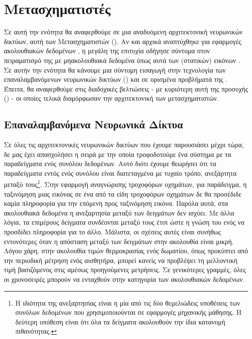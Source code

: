 \section{Μετασχηματιστές}

Σε αυτή την ενότητα θα αναφερθούμε σε μια αναδυόμενη αρχιτεκτονική νευρωνικών δικτύων, αυτή των Μετασχηματιστών (). Αν και αρχικά αναπτύχθηκε για εφαρμογές ακολουθιακών δεδομένων \cite{transformers_attention_is_all_you_need}, η μεγάλη της επιτυχία οδήγησε σύντομα στον πειραματισμό της με μη\textendash ακολουθιακά δεδομένα όπως αυτά των (στατικών) εικόνων \cite{dosovitskiy2020image_is_worth_16, carion2020_end_to_end_transformers}. Σε αυτήν την ενότητα θα κάνουμε μια σύντομη εισαγωγή στην τεχνολογία των επαναλαμβανόμενων νευρωνικών δικτύων ()\cite{rumelhart1985learning_internal_representations} και σε ορισμένα προβλήματά της \cite{hochreiter1997lstm,bahdanau2014neural_machine_translation_attention_begins, transformers_attention_is_all_you_need}. Έπειτα, θα αναφερθούμε στις διαδοχικές βελτιώσεις - με κυριότερη αυτή της προσοχής ()\cite{bahdanau2014neural_machine_translation_attention_begins} - οι οποίες τελικά διαμόρφωσαν την αρχιτεκτονική των μετασχηματιστών.

\subsection{Επαναλαμβανόμενα Νευρωνικά Δίκτυα}
Σε όλες τις αρχιτεκτονικές νευρωνικών δικτύων που έχουμε παρουσιάσει μέχρι τώρα, δε μας έχει απασχολήσει η σειρά με την οποία τροφοδοτούμε ένα σύστημα με τα παραδείγματα ενός συνόλου δεδομένων. Αυτό διότι έχουμε θεωρήσει ότι τα παραδείγματα εντός ενός συνόλου είναι διατεταγμένα με τυχαίο τρόπο, ανεξάρτητα μεταξύ τους\footnote{Η ιδιότητα της ανεξαρτησίας είναι η μία από τις δύο θεμελιώδεις υποθέσεις των συνόλων δεδομένων που χρησιμοποιούνται σε εφαρμογές μηχανικής μάθησης. Η δεύτερη υπόθεση είναι ότι όλα τα δείγματα ακολουθούν την ίδια κατανομή πιθανότητας.}. Στην εφαρμογή αναγνώρισης τροχοφόρων οχημάτων, για παράδειγμα, η ταξινόμηση μιας εικόνας σε ένα από τα είδη τροχοφόρων οχημάτων δε θα προσέδιδε καμία πληροφορία για την επόμενη προς ταξινόμηση εικόνα. Παρόλα αυτά, στα ακολουθιακά δεδομένα η ανεξαρτησία μεταξύ των δειγμάτων δεν ισχύει. Με άλλα λόγια, τα επιμέρους δείγματα συνδέονται μεταξύ τους έτσι ώστε η γνώση του ενός να προσδίδει πληροφορία για το άλλο. Μάλιστα, οι σχέσεις αυτές είναι συνήθως εντονότερες όταν η απόσταση μεταξύ των δειγμάτων στην ακολουθία είναι μικρή. Λόγου χάρη, στην ακολουθία τιμών θερμοκρασίας ενός δωματίου, όπως προκύπτει από την περιοδική μέτρηση ενός αισθητήρα, μπορεί κανείς να προβλέψει τη μελλοντική τιμή βασιζόμενος στις αμέσως προηγούμενες μετρήσεις. Σε γενικότερες γραμμές, όλες οι χρονοσειρές μπορούν να ενταχθούν στην κατηγορία των ακολουθιακών δεδομένων.\par

